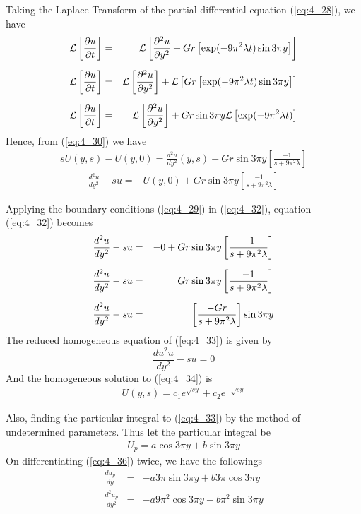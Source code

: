 \documentclass[11pt]{report}
\newcommand{\sps}{\\[0.2cm]}
\newcommand{\refn}[1]{(\ref{#1})}
\newcommand{\refx}[1]{\refn{eq:#1}}
\newcommand{\NI}{\noindent}
\newcommand{\Laplace}{\mathcal{L}}
\newcommand{\sbracket}[1]{\left[#1\right]}
\newcommand{\LFn}[1]{\Laplace \sbracket{#1}}
\newcommand{\Lpt}{Laplace Transform }
\begin{document}
	\NI Taking the \Lpt of the partial differential equation \refx{4_28}, we have
	\begin{eqnarray}
		\LFn{\frac{\partial u}{\partial t}} &=& \LFn{\frac{\partial^2 u}{\partial y^2} + Gr\left[ \exp(-9\pi^2\lambda t)\sin3\pi y\right]}\notag\sps
		\LFn{\frac{\partial u}{\partial t}} &=& \LFn{\frac{\partial^2 u}{\partial y^2}} + \LFn{Gr\left[ \exp(-9\pi^2\lambda t)\sin3\pi y\right]}\notag\sps
		\LFn{\frac{\partial u}{\partial t}} &=& \LFn{\frac{\partial^2 u}{\partial y^2}} + Gr\sin3\pi y\LFn{ \exp(-9\pi^2\lambda t)}\label{eq:4_30}
	\end{eqnarray}
	Hence, from \refx{4_30} we have
	\begin{eqnarray}
		sU(y,s) - U(y,0) = \frac{d^2 u}{d y^2}(y,s) + Gr\sin 3\pi y\left[\frac{-1}{s+9\pi^2\lambda}\right]\label{eq:4_31}
	\end{eqnarray}
	\begin{eqnarray}
		\frac{d^2 u}{d y^2} - su = - U(y,0) + Gr\sin 3\pi y\left[\frac{-1}{s+9\pi^2\lambda}\right]\label{eq:4_32}
	\end{eqnarray}
	
	\NI Applying the boundary conditions \refx{4_29} in \refx{4_32}, equation \refx{4_32} becomes
	\begin{eqnarray}
		\frac{d^2 u}{d y^2} - su &=& - 0 + Gr\sin 3\pi y\left[\frac{-1}{s+9\pi^2\lambda}\right]\notag\sps
		\frac{d^2 u}{d y^2} - su &=&  Gr\sin 3\pi y\left[\frac{-1}{s+9\pi^2\lambda}\right]\notag\sps
		\frac{d^2 u}{d y^2} - su &=& \left[\frac{-Gr}{s+9\pi^2\lambda}\right]\sin 3\pi y\label{eq:4_33}
	\end{eqnarray}
	The reduced homogeneous equation of \refx{4_33} is given by
	\begin{equation}
		\frac{du^2 u}{dy^2} - su = 0\label{eq:4_34}
	\end{equation}
	And the homogeneous solution  to \refx{4_34} is  
	\begin{eqnarray}
		U(y,s) = c_1e^{\sqrt{sy}} + c_2e^{-\sqrt{sy}}\label{eq:4_35}
	\end{eqnarray}
	
	\NI Also, finding the particular integral to \refx{4_33} by the method of undetermined parameters. Thus let the particular integral be
	\begin{eqnarray}
		U_p = a\cos 3\pi y + b\sin 3\pi y\label{eq:4_36}
	\end{eqnarray}
	On differentiating \refx{4_36} twice, we have the followings
	\begin{eqnarray}
		\frac{du_p}{dy} &=& -a3\pi\sin 3\pi y + b3\pi\cos 3\pi y\label{eq:4_37}\sps
		\frac{d^2 u_p}{dy^2} &=& -a9\pi^2\cos3\pi y - b\pi^2\sin3\pi y\label{eq:4_38}
	\end{eqnarray}
	
\end{document}
